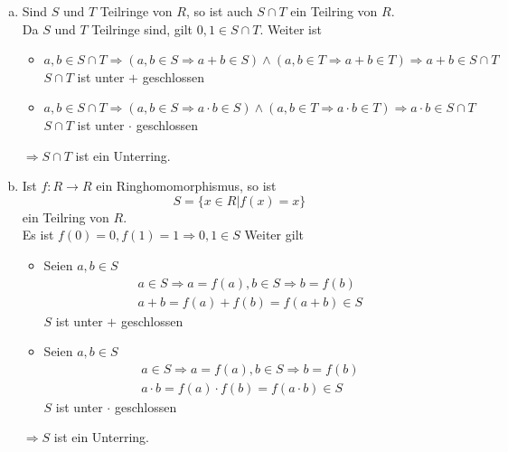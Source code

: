 \documentclass{article}
\newcommand{\Z}{\mathbb{Z}}
\begin{document}
\begin{enumerate}[(a)]
        $\Z[X],\Z[Y]$ sind teilringe,\\
        aber für $f(X)=X,f(Y)=Y\in\Z[X]\cup\Z[Y]$ ist
        $f(X)+f(Y)=X+Y\notin\Z[X]\cup\Z[Y]$.\\
        Also ist $\Z[X]\cup\Z[Y]$ kein Unterring.
    \item
        \color{blue}
        Sind $S$ und $T$ Teilringe von $R$, so ist auch
        $S\cap T$ ein Teilring von $R$.\\
        \color{black}
        Da $S$ und $T$ Teilringe sind, gilt
        $0,1\in S\cap T$.
        Weiter ist
        \begin{itemize}
            \item
                $a,b\in S\cap T\Rightarrow
                (a,b\in S\Rightarrow a+b\in S)\land
                (a,b\in T\Rightarrow a+b\in T)
                \Rightarrow a+b\in S\cap T$\\
                $S\cap T$ ist unter $+$ geschlossen
            \item
                $a,b\in S\cap T\Rightarrow
                (a,b\in S\Rightarrow a\cdot b\in S)\land
                (a,b\in T\Rightarrow a\cdot b\in T)
                \Rightarrow a\cdot b\in S\cap T$\\
                $S\cap T$ ist unter $\cdot$ geschlossen
        \end{itemize}
        $\Rightarrow S\cap T$ ist ein Unterring.
    \item
        \color{blue}
        Ist $f:R\rightarrow R$ ein Ringhomomorphismus,
        so ist
        \begin{equation*}
            S=\{x\in R|f(x)=x\}
        \end{equation*}
        ein Teilring von $R$.\\
        \color{black}
        Es ist $f(0)=0,f(1)=1\Rightarrow 0,1\in S$
        Weiter gilt
        \begin{itemize}
            \item
                Seien  $a,b\in S$
                \begin{align*}
                    a\in S\Rightarrow a=f(a),
                    b\in S\Rightarrow b=f(b)\\
                    a+b=f(a)+f(b)=f(a+b)\in S
                \end{align*}
                $S$ ist unter $+$ geschlossen
            \item
                Seien  $a,b\in S$
                \begin{align*}
                    a\in S\Rightarrow a=f(a),
                    b\in S\Rightarrow b=f(b)\\
                    a\cdot b=f(a)\cdot f(b)=f(a\cdot b)
                    \in S
                \end{align*}
                $S$ ist unter $\cdot$ geschlossen
        \end{itemize}
        $\Rightarrow S$ ist ein Unterring.
\end{enumerate}
\end{document}
